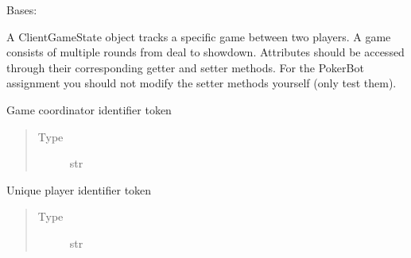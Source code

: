 \documentclass[letterpaper,10pt,english]{sphinxmanual}
\begin{document}
\begin{fulllineitems}
\label{\detokenize{client:client.state.ClientGameState}}
\pysigstartsignatures
{}
\pysigstopsignatures
\sphinxAtStartPar
Bases: 

\sphinxAtStartPar
A ClientGameState object tracks a specific game between two players. A game consists of multiple rounds from deal
to showdown. Attributes should be accessed through their corresponding getter and setter methods. For the PokerBot
assignment you should not modify the setter methods yourself (only test them).

\begin{fulllineitems}
\label{\detokenize{client:client.state.ClientGameState._coordinator_id}}
\pysigstartsignatures
{}
\pysigstopsignatures
\sphinxAtStartPar
Game coordinator identifier token
\begin{quote}\begin{description}
\item[{Type}] \leavevmode
\sphinxAtStartPar
str

\end{description}\end{quote}

\end{fulllineitems}


\begin{fulllineitems}
\label{\detokenize{client:client.state.ClientGameState._player_token}}
\pysigstartsignatures
{}
\pysigstopsignatures
\sphinxAtStartPar
Unique player identifier token
\begin{quote}\begin{description}
\item[{Type}] \leavevmode
\sphinxAtStartPar
str

\end{description}\end{quote}


\end{fulllineitems}
\end{fulllineitems}
\end{document}
